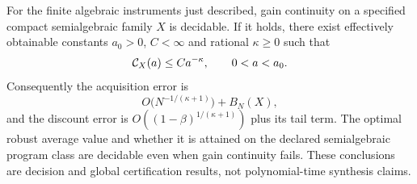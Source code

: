 \begin{theorem}\label{thm:algebraic}
For the finite algebraic instruments just described, gain continuity on a specified compact semialgebraic family $X$ is decidable. If it holds, there exist effectively obtainable constants $a_0>0$, $C<\infty$ and rational $\kappa\ge0$ such that
\begin{equation}\label{eq:algebraic-price}
 \mathcal C_X(a)\le C a^{-\kappa},\qquad 0<a<a_0.
\end{equation}
Consequently the acquisition error is
\begin{equation}\label{eq:algebraic-rate}
 O\bigl(N^{-1/(\kappa+1)}\bigr)+B_N(X),
\end{equation}
and the discount error is $O((1-\beta)^{1/(\kappa+1)})$ plus its tail term. The optimal robust average value and whether it is attained on the declared semialgebraic program class are decidable even when gain continuity fails. These conclusions are decision and global certification results, not polynomial-time synthesis claims.
\end{theorem}
